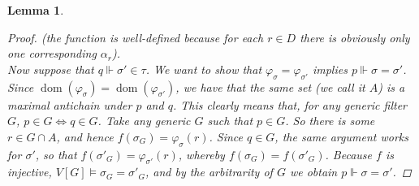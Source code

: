 \documentclass[11pt,a4paper]{report}
\newtheorem{lemma}[theorem]{Lemma}
\theoremstyle{definition}
\newtheorem{defn}[theorem]{Definition}
\theoremstyle{num.custom-title}
\theoremstyle{custom-title}
\DeclareMathOperator{\dom}{dom}
\newcommand*{\defeq}{\mathrel{\rlap{%
                     \raisebox{0.3ex}{$\cdot$}}%
                     \raisebox{-0.3ex}{$\cdot$}}%
                     =}
\renewcommand{\phi}{\varphi}
\renewcommand{\iff}{\Leftrightarrow}
\newcommand{\forces}{\Vdash}
\begin{document}
\begin{lemma}
\begin{proof}
(the function is well-defined because for each $r \in D$ there is obviously only one corresponding $\alpha_r$).\\
Now suppose that $q \forces \sigma' \in \tau$. We want to show that $\phi_\sigma = \phi_{\sigma'}$ implies $p \forces \sigma = \sigma'$. Since $\dom(\phi_\sigma) = \dom(\phi_{\sigma'})$, we have that the same set (we call it $A$) is a maximal antichain under $p$ and $q$. This clearly means that, for any generic filter $G$, $p \in G \iff q \in G$.
Take any generic $G$ such that $p \in G$. So there is some $r \in G \cap A$, and hence $f(\sigma_G) = \phi_\sigma (r)$. Since $q \in G$, the same argument works for $\sigma'$, so that $f(\sigma'_G) = \phi_{\sigma'}(r)$, whereby $f(\sigma_G) = f(\sigma'_G)$. Because $f$ is injective, $V[G] \models \sigma_G = \sigma'_G$, and by the arbitrarity of $G$ we obtain $p \forces \sigma = \sigma'$.
\end{proof}
\end{lemma}



\end{document}
